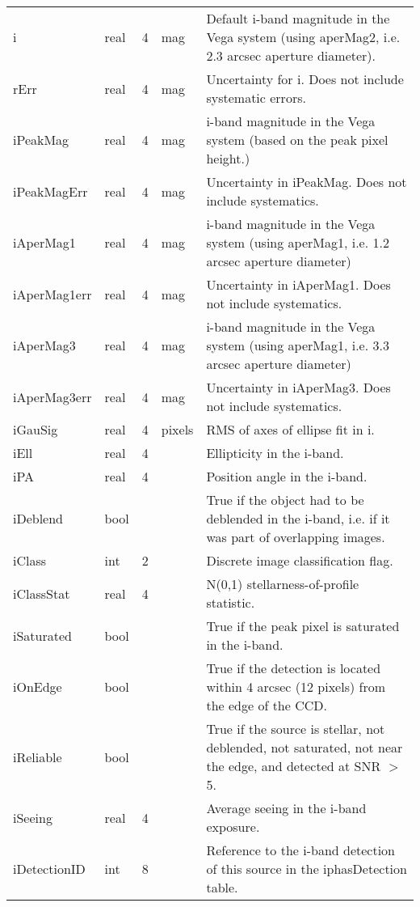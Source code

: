\documentclass[12pt]{article}
\begin{document}
\begin{center}
\begin{longtable}{llclp{9cm}}
i & real & 4 & mag & Default i-band magnitude in the Vega system (using aperMag2, i.e. 2.3 arcsec aperture diameter). \\ 
rErr & real & 4 & mag & Uncertainty for i. Does not include systematic errors. \\ 
iPeakMag & real & 4 & mag & i-band magnitude in the Vega system (based on the peak pixel height.) \\ 
iPeakMagErr & real & 4 & mag & Uncertainty in iPeakMag. Does not include systematics. \\ 
iAperMag1 & real & 4 & mag & i-band magnitude in the Vega system (using aperMag1, i.e. 1.2 arcsec aperture diameter) \\ 
iAperMag1err & real & 4 & mag & Uncertainty in iAperMag1. Does not include systematics. \\ 
iAperMag3 & real & 4 & mag & i-band magnitude in the Vega system (using aperMag1, i.e. 3.3 arcsec aperture diameter) \\ 
iAperMag3err & real & 4 & mag & Uncertainty in iAperMag3. Does not include systematics. \\ 
iGauSig & real & 4 & pixels & RMS of axes of ellipse fit in i. \\ 
iEll & real & 4 & & Ellipticity in the i-band. \\
iPA & real & 4 & & Position angle in the i-band. \\
iDeblend & bool &  &  & True if the object had to be deblended in the i-band, i.e. if it was part of overlapping images. \\ 
iClass & int & 2 & & Discrete image classification flag. \\
iClassStat & real & 4 & & N(0,1) stellarness-of-profile statistic. \\
iSaturated & bool &  &  & True if the peak pixel is saturated in the i-band. \\ 
iOnEdge & bool &  &  & True if the detection is located within 4 arcsec (12 pixels) from the edge of the CCD. \\ 
iReliable & bool & & & True if the source is stellar, not deblended, not saturated, not near the edge, and detected at SNR $>$ 5. \\
iSeeing & real & 4 & & Average seeing in the i-band exposure. \\
iDetectionID & int & 8 & & Reference to the i-band detection of this source in the iphasDetection table. \\



\end{longtable}
\end{center}
\end{document}
